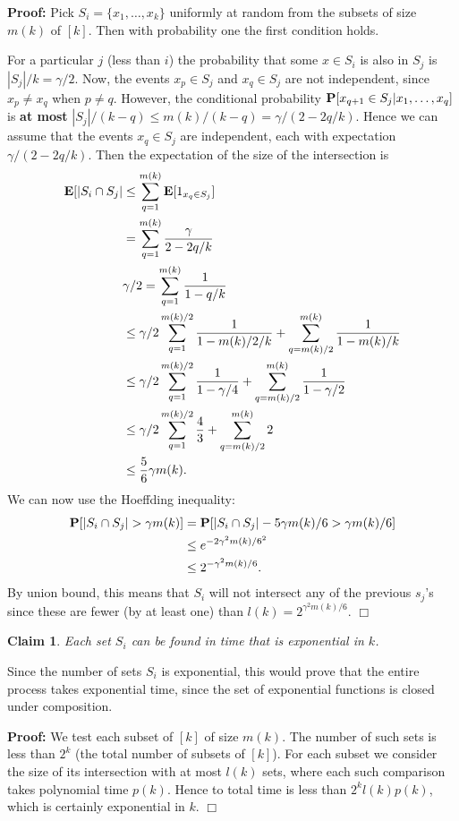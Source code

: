 \documentclass[11pt]{article} \usepackage{amssymb}
\newtheorem{claim}[theorem]{Claim}
\newenvironment{proof}{\noindent \textbf{Proof:}}{$\Box$}
\newcommand{\E}{{\bf E}} \newcommand{\Cov}{{\bf Cov}}
\begin{document}
\begin{enumerate}
\begin{proof}
    Pick $S_i=\{x_1,\ldots,x_k\}$ uniformly at random from the subsets of size 
    $m(k)$ of $[k]$.
    Then with probability one the first condition holds. 
    
    For a particular $j$ (less than $i$) the probability that some $x\in S_i$ is also
    in $S_j$ is $|S_j|/k=\gamma /2$. Now, the events $x_p\in S_j$ and $x_q\in S_j$ are 
    not independent, since $x_p\neq x_q$ when $p \neq q$. However, the conditional 
    probability 
    $\P[x_{q+1}\in S_j|x_1,\ldots,x_q]$ is {\bf at most} 
    $|S_j|/(k-q)\leq m(k)/(k-q)=\gamma /(2-2q/k)$. Hence we can assume that the
    events $x_q\in S_j$ are independent, each with expectation $\gamma /(2-2q/k)$.
    Then the expectation of the size of the intersection is
    \begin{align*}
      \E[|S_i \cap S_j| &\leq \sum_{q=1}^{m(k)} \E[1_{x_q\in S_j}]
      \\  &=\sum_{q=1}^{m(k)}{\gamma \over 2 - 2q/k}
      \\  &\gamma/2=\sum_{q=1}^{m(k)}{1 \over 1 - q/k}
      \\  &\leq \gamma/2\sum_{q=1}^{m(k)/2}{1 \over 1 - m(k)/2/k}+\sum_{q=m(k)/2}^{m(k)}{1 \over 1 - m(k)/k}
      \\  &\leq \gamma/2\sum_{q=1}^{m(k)/2}{1 \over 1 - \gamma/4}+\sum_{q=m(k)/2}^{m(k)}{1 \over 1 - \gamma/2}
      \\  &\leq \gamma/2\sum_{q=1}^{m(k)/2}{4 \over 3}+\sum_{q=m(k)/2}^{m(k)}2
      \\  &\leq {5\over 6}\gamma m(k).
    \end{align*}
    We can now use the Hoeffding inequality:
    \begin{align*}
      \P[|S_i\cap S_j|>\gamma m(k)] &= \P[|S_i\cap S_j|- 5\gamma m(k)/6>\gamma m(k)/6]
      \\ &\leq e^{-2\gamma^2 m(k)/6^2}
      \\ &\leq 2^{-\gamma^2 m(k)/6}.
    \end{align*}
    By union bound, this means that $S_i$ will not intersect any of the previous
    $s_j$'s since these are fewer (by at least one) than 
    $l(k)=2^{\gamma^2 m(k)/6}$. 
  \end{proof}
  
  \begin{claim}
    Each set $S_i$ can be found in time that is exponential in $k$.  
  \end{claim}
  Since the number of sets $S_i$ is exponential, this would prove that the entire 
  process takes exponential time, since the set of exponential functions is 
  closed under composition.
  
  \begin{proof}
    We test each subset of  $[k]$ of size $m(k)$. The number of such sets is less 
    than $2^k$ (the total number of subsets of $[k]$). For each subset we consider
    the size of its intersection with at most $l(k)$ sets, where each such 
    comparison takes polynomial time $p(k)$. Hence to total time is less than 
    $2^kl(k)p(k)$, which is certainly exponential in $k$.
  \end{proof}
  


\end{enumerate}
\end{document}
